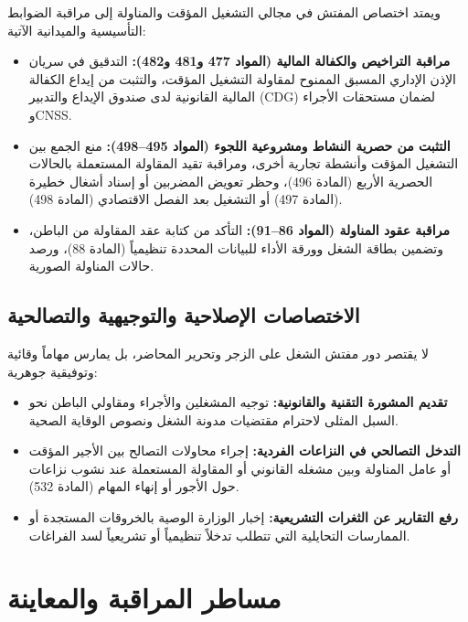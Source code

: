 ويمتد اختصاص المفتش في مجالي التشغيل المؤقت والمناولة إلى مراقبة الضوابط التأسيسية والميدانية الآتية:
\begin{itemize}[leftmargin=*, itemsep=5pt]
    \item \textbf{مراقبة التراخيص والكفالة المالية (المواد \textenglish{477} و\textenglish{481} و\textenglish{482}):} التدقيق في سريان الإذن الإداري المسبق الممنوح لمقاولة التشغيل المؤقت، والتثبت من إيداع الكفالة المالية القانونية لدى صندوق الإيداع والتدبير (\textenglish{CDG}) لضمان مستحقات الأجراء و\textenglish{CNSS}.
    \item \textbf{التثبت من حصرية النشاط ومشروعية اللجوء (المواد \textenglish{495}--\textenglish{498}):} منع الجمع بين التشغيل المؤقت وأنشطة تجارية أخرى، ومراقبة تقيد المقاولة المستعملة بالحالات الحصرية الأربع (المادة \textenglish{496})، وحظر تعويض المضربين أو إسناد أشغال خطيرة (المادة \textenglish{497}) أو التشغيل بعد الفصل الاقتصادي (المادة \textenglish{498}).
    \item \textbf{مراقبة عقود المناولة (المواد \textenglish{86}--\textenglish{91}):} التأكد من كتابة عقد المقاولة من الباطن، وتضمين بطاقة الشغل وورقة الأداء للبيانات المحددة تنظيمياً (المادة \textenglish{88})، ورصد حالات المناولة الصورية.
\end{itemize}

\subsection{الاختصاصات الإصلاحية والتوجيهية والتصالحية}
لا يقتصر دور مفتش الشغل على الزجر وتحرير المحاضر، بل يمارس مهاماً وقائية وتوفيقية جوهرية:
\begin{itemize}[leftmargin=*, itemsep=5pt]
    \item \textbf{تقديم المشورة التقنية والقانونية:} توجيه المشغلين والأجراء ومقاولي الباطن نحو السبل المثلى لاحترام مقتضيات مدونة الشغل ونصوص الوقاية الصحية.
    \item \textbf{التدخل التصالحي في النزاعات الفردية:} إجراء محاولات التصالح بين الأجير المؤقت أو عامل المناولة وبين مشغله القانوني أو المقاولة المستعملة عند نشوب نزاعات حول الأجور أو إنهاء المهام (المادة \textenglish{532}).
    \item \textbf{رفع التقارير عن الثغرات التشريعية:} إخبار الوزارة الوصية بالخروقات المستجدة أو الممارسات التحايلية التي تتطلب تدخلاً تنظيمياً أو تشريعياً لسد الفراغات.
\end{itemize}

\section{مساطر المراقبة والمعاينة}

